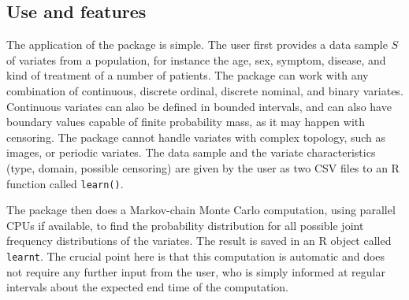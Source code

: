 \subsection*{Use and features}
\label{sec:features}

The application of the package is simple. The user first provides a data sample $S$ of variates from a population, for instance the age, sex, symptom, disease, and kind of treatment of a number of patients. The package can work with any combination of continuous, discrete ordinal, discrete nominal, and binary variates. Continuous variates can also be defined in bounded intervals, and can also have boundary values capable of finite probability mass, as it may happen with censoring. The package cannot handle variates with complex topology, such as images, or periodic variates. The data sample and the variate characteristics (type, domain, possible censoring) are given by the user as two CSV files to an R function called \texttt{learn()}.

The package then does a Markov-chain Monte Carlo computation, using parallel CPUs if available, to find the probability distribution for all possible joint frequency distributions of the variates. The result is saved in an R object called \texttt{learnt}. The crucial point here is that this computation is automatic and does not require any further input from the user, who is simply informed at regular intervals about the expected end time of the computation.

